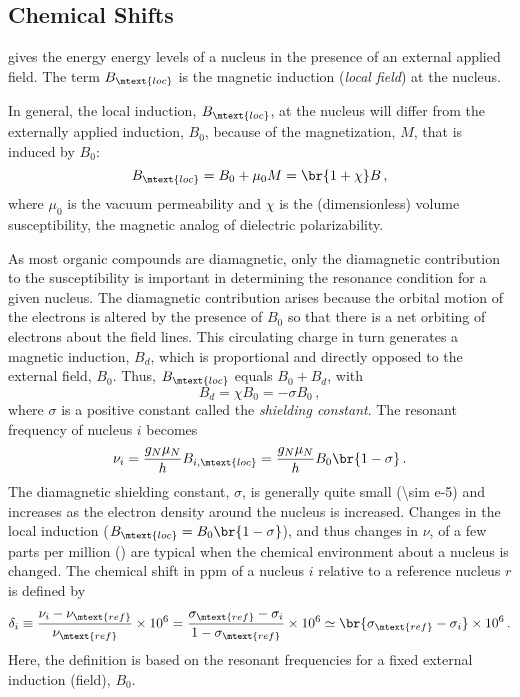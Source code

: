 \documentclass[nobib,nofonts,nols,nohyper]{tufte-handout}
\begin{document}
\subsection{Chemical Shifts} %
\label{sub:chemical_shifts}

 gives the energy energy levels of a nucleus in the presence of an external applied field. 
The term \( B_\mtext{loc} \) is the magnetic induction (\emph{local field}) at the nucleus. 

In general, the local induction, \( B_\mtext{loc} \), at the nucleus will differ from the externally applied induction, \( B_0 \), because of the magnetization, \( M \), that is induced by \( B_0 \):
\begin{equation}
	B_\mtext{loc} = B_0 + \mu_0 M = \br{1 + \chi} B \, ,
	\label{eq:b_loc}
\end{equation}
where \( \mu_0 \) is the vacuum permeability and \( \chi \) is the (dimensionless) volume susceptibility, the magnetic analog of dielectric polarizability. 

As most organic compounds are diamagnetic, only the diamagnetic contribution to the susceptibility is important in determining the resonance condition for a given nucleus. 
The diamagnetic contribution arises because the orbital motion of the electrons is altered by the presence of \( B_0 \) so that there is a net orbiting of electrons about the field lines. 
This circulating charge in turn generates a magnetic induction, \( B_d \), which is proportional and directly opposed to the external field, \( B_0 \). 
Thus, \( B_\mtext{loc} \) equals \( B_0 + B_d \), with
\begin{equation}
	B_d = \chi B_0 = -\sigma B_0 \, ,
	\label{eq:B_dia}
\end{equation}
where \( \sigma \) is a positive constant called the \emph{shielding constant}. 
The resonant frequency of nucleus \( i \) becomes 
\begin{equation}
	\nu_i = \frac{g_N \mu_N}{h} B_{i, \mtext{loc}} = \frac{g_N \mu_N}{h} B_0 \br{1 - \sigma} \, .
	\label{eq:chem_shift}
\end{equation} 
The diamagnetic shielding constant, \( \sigma \), is generally quite small (\num{\sim e-5}) and increases as the electron density around the nucleus is increased. 
Changes in the local induction (\( B_\mtext{loc} = B_0 \br{1 - \sigma} \)), and thus changes in \( \nu \), of a few parts per million (\si{\ppm}) are typical when the chemical environment about a nucleus is changed. 
The chemical shift in \si{ppm} of a nucleus \( i \) relative to a reference nucleus \( r \) is defined by 
\begin{equation}
	\delta_{i} \equiv 
		\frac{\nu_{i}-\nu_\mtext{ref}}{\nu_\mtext{ref}} \times 10^6 = 
		\frac{\sigma_\mtext{ref} - \sigma_i}{1 - \sigma_\mtext{ref}} \times 10^6 \simeq 
		\br{\sigma_\mtext{ref} - \sigma_i} \times 10^6 \, .
		\label{eq:chem_shift_delta}
\end{equation}
Here, the definition is based on the resonant frequencies for a fixed external induction (field), \( B_0 \). 
\end{document}
